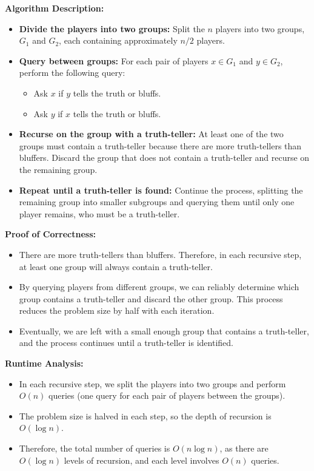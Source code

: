 \documentclass[11pt]{article}
\begin{document}
\textbf{Algorithm Description:}
\begin{itemize}
    \item \textbf{Divide the players into two groups:} Split the \(n\) players into two groups, \(G_1\) and \(G_2\), each containing approximately \(n/2\) players.
    \item \textbf{Query between groups:} For each pair of players \(x \in G_1\) and \(y \in G_2\), perform the following query:
        \begin{itemize}
            \item Ask \(x\) if \(y\) tells the truth or bluffs.
            \item Ask \(y\) if \(x\) tells the truth or bluffs.
        \end{itemize}
    \item \textbf{Recurse on the group with a truth-teller:} At least one of the two groups must contain a truth-teller because there are more truth-tellers than bluffers. Discard the group that does not contain a truth-teller and recurse on the remaining group.
    \item \textbf{Repeat until a truth-teller is found:} Continue the process, splitting the remaining group into smaller subgroups and querying them until only one player remains, who must be a truth-teller.
\end{itemize}

\textbf{Proof of Correctness:}
\begin{itemize}
    \item There are more truth-tellers than bluffers. Therefore, in each recursive step, at least one group will always contain a truth-teller.
    \item By querying players from different groups, we can reliably determine which group contains a truth-teller and discard the other group. This process reduces the problem size by half with each iteration.
    \item Eventually, we are left with a small enough group that contains a truth-teller, and the process continues until a truth-teller is identified.
\end{itemize}

\textbf{Runtime Analysis:}
\begin{itemize}
    \item In each recursive step, we split the players into two groups and perform \(O(n)\) queries (one query for each pair of players between the groups).
    \item The problem size is halved in each step, so the depth of recursion is \(O(\log n)\).
    \item Therefore, the total number of queries is \(O(n \log n)\), as there are \(O(\log n)\) levels of recursion, and each level involves \(O(n)\) queries.
\end{itemize}
\end{document}
